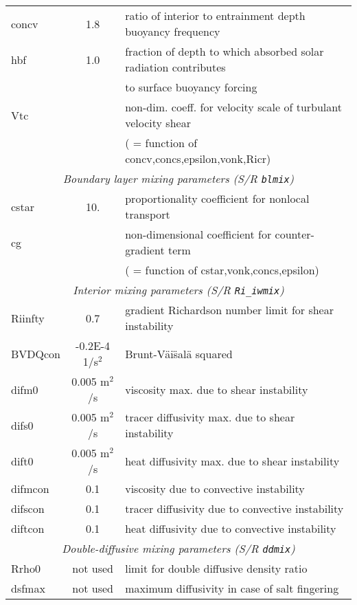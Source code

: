 \begin{table}[!ht]
{\begin{tabular}{|l|c|l|}
        concv & 1.8 & 
           ratio of interior to  entrainment depth buoyancy frequency \\
        hbf & 1.0 & 
           fraction of depth to which absorbed solar radiation contributes \\
        ~ & ~ &
           to surface buoyancy forcing \\
        Vtc & \texttt{~} & 
           non-dim. coeff. for velocity scale of turbulant velocity shear \\
        ~ & ~ &
           ( = function of concv,concs,epsilon,vonk,Ricr) \\
      \hline
      \multicolumn{3}{|c|}{\textit{Boundary layer mixing parameters (S/R \texttt{blmix})} } \\
      \hline
        cstar & 10. & 
           proportionality coefficient for nonlocal transport \\
        cg & ~ & 
           non-dimensional coefficient for counter-gradient term \\
        ~ & ~ &
           ( = function of cstar,vonk,concs,epsilon) \\
      \hline
      \multicolumn{3}{|c|}{\textit{Interior mixing parameters (S/R \texttt{Ri\_iwmix})} } \\
      \hline
        Riinfty & 0.7 & 
           gradient Richardson number limit for shear instability \\
        BVDQcon & -0.2E-4 1/s$^2$ & 
           Brunt-V\"ai\"sal\"a squared \\
        difm0 & 0.005 m$^2$/s & 
           viscosity max. due to shear instability \\
        difs0 & 0.005 m$^2$/s & 
           tracer diffusivity max. due to shear instability \\
        dift0 & 0.005 m$^2$/s & 
           heat diffusivity max. due to shear instability \\
        difmcon & 0.1 & 
           viscosity due to convective instability \\
        difscon & 0.1 & 
           tracer diffusivity due to convective instability \\
        diftcon & 0.1 & 
           heat diffusivity due to convective instability \\
      \hline
      \multicolumn{3}{|c|}{\textit{Double-diffusive mixing parameters (S/R \texttt{ddmix})} } \\
      \hline
        Rrho0 & not used & 
           limit for double diffusive density ratio \\
        dsfmax & not used & 
           maximum diffusivity in case of salt fingering \\
         \hline
      \hline
    \end{tabular}
  }
  \caption{~}
\end{table}



